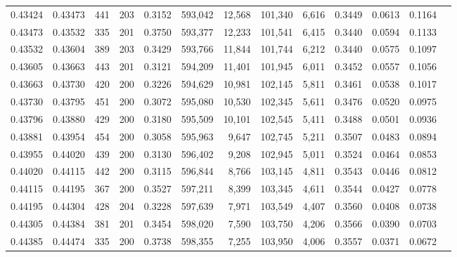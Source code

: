 \begin{tabular}{rrrrrrrrrrrrr}
0.43424 & 0.43473 &   441 & 203 &                                     0.3152 & 593,042 &  12,568 & 101,340 &   6,616 & 0.3449 & 0.0613 & 0.1164 \\
0.43473 & 0.43532 &   335 & 201 &                                     0.3750 & 593,377 &  12,233 & 101,541 &   6,415 & 0.3440 & 0.0594 & 0.1133 \\
0.43532 & 0.43604 &   389 & 203 &                                     0.3429 & 593,766 &  11,844 & 101,744 &   6,212 & 0.3440 & 0.0575 & 0.1097 \\
0.43605 & 0.43663 &   443 & 201 &                                     0.3121 & 594,209 &  11,401 & 101,945 &   6,011 & 0.3452 & 0.0557 & 0.1056 \\
0.43663 & 0.43730 &   420 & 200 &                                     0.3226 & 594,629 &  10,981 & 102,145 &   5,811 & 0.3461 & 0.0538 & 0.1017 \\
0.43730 & 0.43795 &   451 & 200 &                                     0.3072 & 595,080 &  10,530 & 102,345 &   5,611 & 0.3476 & 0.0520 & 0.0975 \\
0.43796 & 0.43880 &   429 & 200 &                                     0.3180 & 595,509 &  10,101 & 102,545 &   5,411 & 0.3488 & 0.0501 & 0.0936 \\
0.43881 & 0.43954 &   454 & 200 &                                     0.3058 & 595,963 &   9,647 & 102,745 &   5,211 & 0.3507 & 0.0483 & 0.0894 \\
0.43955 & 0.44020 &   439 & 200 &                                     0.3130 & 596,402 &   9,208 & 102,945 &   5,011 & 0.3524 & 0.0464 & 0.0853 \\
0.44020 & 0.44115 &   442 & 200 &                                     0.3115 & 596,844 &   8,766 & 103,145 &   4,811 & 0.3543 & 0.0446 & 0.0812 \\
0.44115 & 0.44195 &   367 & 200 &                                     0.3527 & 597,211 &   8,399 & 103,345 &   4,611 & 0.3544 & 0.0427 & 0.0778 \\
0.44195 & 0.44304 &   428 & 204 &                                     0.3228 & 597,639 &   7,971 & 103,549 &   4,407 & 0.3560 & 0.0408 & 0.0738 \\
0.44305 & 0.44384 &   381 & 201 &                                     0.3454 & 598,020 &   7,590 & 103,750 &   4,206 & 0.3566 & 0.0390 & 0.0703 \\
0.44385 & 0.44474 &   335 & 200 &                                     0.3738 & 598,355 &   7,255 & 103,950 &   4,006 & 0.3557 & 0.0371 & 0.0672 \\

\end{tabular}
